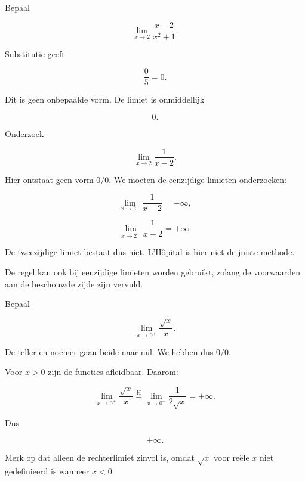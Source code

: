 \documentclass{ximera}
\begin{document}
\begin{voorbeeld}
Bepaal

\[\lim_{x\to2}\frac{x-2}{x^2+1}.\]

Substitutie geeft

\[\frac05=0.\]

Dit is geen onbepaalde vorm. De limiet is onmiddellijk

\[\boxed{0}.\]
\end{voorbeeld}

\begin{voorbeeld}
Onderzoek

\[\lim_{x\to2}\frac1{x-2}.\]

Hier ontstaat geen vorm \(0/0\). We moeten de eenzijdige limieten
onderzoeken:

\[\lim_{x\to2^-}\frac1{x-2}=-\infty,\]

\[\lim_{x\to2^+}\frac1{x-2}=+\infty.\]

De tweezijdige limiet bestaat dus niet. L'Hôpital is hier niet de juiste
methode.
\end{voorbeeld}



De regel kan ook bij eenzijdige limieten worden gebruikt, zolang de
voorwaarden aan de beschouwde zijde zijn vervuld.

\begin{voorbeeld}
Bepaal

\[\lim_{x\to0^+}\frac{\sqrt{x}}{x}.\]

De teller en noemer gaan beide naar nul. We hebben dus \(0/0\).

Voor \(x>0\) zijn de functies afleidbaar. Daarom:

\[
\lim_{x\to0^+}\frac{\sqrt{x}}{x}
\overset{\mathrm H}{=}
\lim_{x\to0^+}\frac{1}{2\sqrt{x}}
=+\infty.
\]

Dus

\[\boxed{+\infty}.\]

Merk op dat alleen de rechterlimiet zinvol is, omdat \(\sqrt{x}\) voor
reële \(x\) niet gedefinieerd is wanneer \(x<0\).
\end{voorbeeld}
\end{document}
